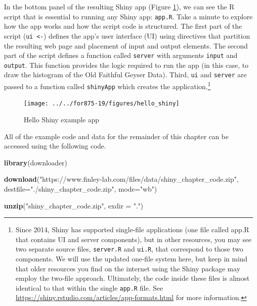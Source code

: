 \documentclass[
]{krantz}
\makeatletter
\newenvironment{Shaded}{\begin{snugshade}}{\end{snugshade}}
\newcommand{\DataTypeTok}[1]{\textcolor[rgb]{0.27,0.27,0.27}{#1}}
\newcommand{\KeywordTok}[1]{\textcolor[rgb]{0.27,0.27,0.27}{\textbf{#1}}}
\newcommand{\NormalTok}[1]{#1}
\newcommand{\StringTok}[1]{\textcolor[rgb]{0.5,0.5,0.5}{#1}}
\newenvironment{kframe}{%
\medskip{}
\setlength{\fboxsep}{.8em}
 \def\at@end@of@kframe{}%
 \ifinner\ifhmode%
  \def\at@end@of@kframe{\end{minipage}}%
  \begin{minipage}{\columnwidth}%
 \fi\fi%
 \def\FrameCommand##1{\hskip\@totalleftmargin \hskip-\fboxsep
 \colorbox{shadecolor}{##1}\hskip-\fboxsep
     \hskip-\linewidth \hskip-\@totalleftmargin \hskip\columnwidth}%
 \MakeFramed {\advance\hsize-\width
   \@totalleftmargin\z@ \linewidth\hsize
   \@setminipage}}%
 {\par\unskip\endMakeFramed%
 \at@end@of@kframe}
\renewenvironment{Shaded}{\begin{kframe}}{\end{kframe}}
\makeatother
\begin{document}
In the bottom panel of the resulting Shiny app (Figure \ref{fig:hello}), we can see the R script that is essential to running any Shiny app: \texttt{app.R}. Take a minute to explore how the app works and how the script code is structured. The first part of the script (\texttt{ui\ \textless{}-}) defines the app's user interface (UI) using directives that partition the resulting web page and placement of input and output elements. The second part of the script defines a function called \texttt{server} with arguments \texttt{input} and \texttt{output}. This function provides the logic required to run the app (in this case, to draw the histogram of the Old Faithful Geyser Data). Third, \texttt{ui} and \texttt{server} are passed to a function called \texttt{shinyApp} which creates the application.\footnote{Since 2014, Shiny has supported single-file applications (one file called app.R that contains UI and server components), but in other resources, you may see two separate source files, \texttt{server.R} and \texttt{ui.R}, that correspond to those two components. We will use the updated one-file system here, but keep in mind that older resources you find on the internet using the Shiny package may employ the two-file approach. Ultimately, the code inside these files is almost identical to that within the single \texttt{app.R} file. See \url{https://shiny.rstudio.com/articles/app-formats.html} for more information.}

\begin{figure}
\texttt{[image: ../../for875-19/figures/hello\_shiny]} \caption{Hello Shiny example app}\label{fig:hello}
\end{figure}

All of the example code and data for the remainder of this chapter can be accessed using the following code.

\begin{Shaded}
\begin{Highlighting}[]
\KeywordTok{library}\NormalTok{(downloader)}

\KeywordTok{download}\NormalTok{(}\StringTok{"https://www.finley{-}lab.com/files/data/shiny\_chapter\_code.zip"}\NormalTok{, }
         \DataTypeTok{destfile=}\StringTok{"./shiny\_chapter\_code.zip"}\NormalTok{, }\DataTypeTok{mode=}\StringTok{"wb"}\NormalTok{)}

\KeywordTok{unzip}\NormalTok{(}\StringTok{"shiny\_chapter\_code.zip"}\NormalTok{, }\DataTypeTok{exdir =} \StringTok{"."}\NormalTok{)}
\end{Highlighting}
\end{Shaded}
\end{document}
